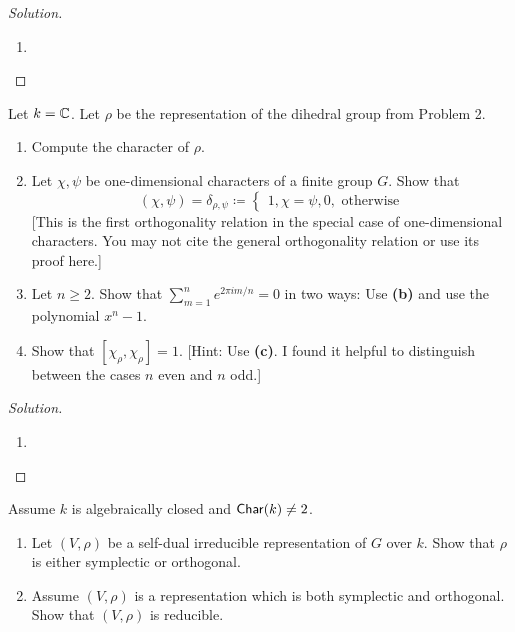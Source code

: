 \begin{proof}[Solution]
\hfill
\begin{enumerate}[font=\normalfont,label=\textbf{(\alph*)}, wide]
\item
\end{enumerate}
\end{proof}

\newpage



\begin{problem}
Let $k = \mathbb{C}$. Let $\rho$ be the representation of the dihedral group from Problem 2.

\begin{enumerate}[font=\normalfont,label=\textbf{(\alph*)}]
\item Compute the character of $\rho$.

\item Let $\chi, \psi$ be one-dimensional characters of a finite group $G$. Show that
\[
(\chi, \psi) = \delta_{\rho, \psi} \coloneqq
\begin{cases}
1, \chi = \psi,
0, \text{ otherwise}
\end{cases}
\]
[This is the first orthogonality relation in the special case of one-dimensional characters. You may not cite the general orthogonality relation or use its proof here.]
\item Let $n \geq 2$. Show that $\sum_{m=1}^n e^{2\pi im/n} = 0$ in two ways: Use \textbf{(b)} and use the polynomial $x^n-1$.
\item Show that $[\chi_\rho, \chi_\rho] = 1$. [Hint: Use \textbf{(c)}. I found it helpful to distinguish between the cases $n$ even and $n$ odd.]
\end{enumerate}
\end{problem}

\begin{proof}[Solution]
\hfill
\begin{enumerate}[font=\normalfont,label=\textbf{(\alph*)}, wide]
\item
\end{enumerate}
\end{proof}

\newpage


\begin{problem}
Assume $k$ is algebraically closed and $\mathsf{Char}(k) \neq 2$.

\begin{enumerate}[font=\normalfont,label=\textbf{(\alph*)}]
\item Let $(V, \rho)$ be a self-dual irreducible representation of $G$ over $k$. Show that $\rho$ is either symplectic or orthogonal.

\item Assume $(V, \rho)$ is a representation which is both symplectic and orthogonal. Show that $(V, \rho)$ is reducible.

\end{enumerate}
\end{problem}

